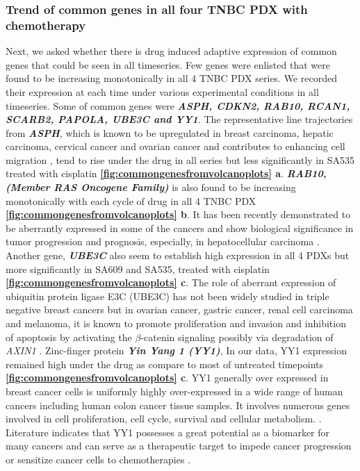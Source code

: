 \subsubsection{Trend of common genes in all four TNBC PDX with  chemotherapy}
Next, we asked whether there is drug induced adaptive expression of common genes that could be seen in all timeseries. 
 Few genes were enlisted that were found to be increasing monotonically in all 4 TNBC PDX series. We recorded their expression at each time under various experimental conditions in all timeseries. Some of common genes were  \textit{\textbf{ASPH, CDKN2, RAB10, RCAN1, SCARB2, PAPOLA, UBE3C and YY1}}. The representative line trajectories from \textit{\textbf{ASPH}}, which is known to be upregulated in breast carcinoma, hepatic carcinoma, cervical cancer and ovarian cancer and contributes to enhancing cell migration  \cite{zheng2020diverse,li2018expression, hou2018recent, lin2019asph}, tend to rise under the drug in all series but less significantly in SA535 treated with cisplatin \textbf{\autoref{fig:commongenesfromvolcanoplots} a}. 
 \textit{\textbf{RAB10, (Member RAS Oncogene Family)}} is also found to be increasing monotonically with each cycle of drug in all 4 TNBC PDX \textbf{\autoref{fig:commongenesfromvolcanoplots} b}. It has been recently demonstrated to be aberrantly expressed in some of the cancers and show biological significance in tumor progression and prognosis, especially, in hepatocellular carcinoma \cite{wang2017rab10, he2002identification, jiang2016mir}. 
Another gene,  \textit{\textbf{UBE3C}} also seem to establish high expression in all 4 PDXs but more significantly in SA609 and SA535, treated with cisplatin \textbf{\autoref{fig:commongenesfromvolcanoplots} c}. The role of aberrant expression of ubiquitin protein ligase E3C (UBE3C) has not been widely studied in triple negative breast cancers but in ovarian cancer, gastric cancer, renal cell carcinoma and melanoma, it is known to promote proliferation and invasion and inhibition of apoptosis by activating the $\beta$-catenin signaling possibly via degradation of  \textit{AXIN1} \cite{xiong2019mir, pan2015ubiquitin, zhang2020ube3c}.
  Zinc-finger protein  \textit{\textbf{Yin Yang 1 (YY1)}}, In our data, YY1 expression remained high under the drug as compare to most of untreated timepoints \textbf{\autoref{fig:commongenesfromvolcanoplots} c}. YY1 generally over expressed in breast cancer cells 
is uniformly highly over-expressed in a wide range of human cancers including human colon cancer tissue samples. It involves numerous genes involved in cell proliferation, cell cycle, survival and cellular metabolism.  \cite{wan2012yin, chinnappan2009transcription, meliala2020biological}. Literature indicates that YY1 possesses a great potential as a biomarker for many cancers and can serve as a therapeutic target to impede cancer progression or sensitize cancer cells to chemotherapies \cite{wan2012yin, chinnappan2009transcription, meliala2020biological, shi2015role}.

